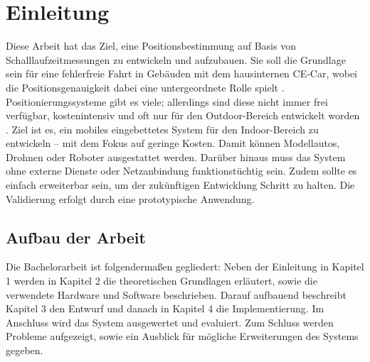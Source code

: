 \newpage
\section{Einleitung}

Diese Arbeit hat das Ziel, eine Positionsbestimmung auf Basis von Schalllaufzeitmessungen zu entwickeln und aufzubauen. Sie soll die Grundlage sein für eine fehlerfreie Fahrt in Gebäuden mit dem hausinternen CE-Car, wobei die Positionsgenauigkeit dabei eine untergeordnete Rolle spielt \cite{src_CE_CAR}. Positionierungssysteme gibt es viele; allerdings sind diese nicht immer frei verfügbar, kostenintensiv und oft nur für den Outdoor-Bereich entwickelt worden \cite{src_INDOOR_OUTDOOR}. Ziel ist es, ein mobiles eingebettetes System für den Indoor-Bereich zu entwickeln -- mit dem Fokus auf geringe Kosten. Damit können Modellautos, Drohnen oder Roboter ausgestattet werden. Darüber hinaus muss das System ohne externe Dienste oder Netzanbindung funktionstüchtig sein. Zudem sollte es einfach erweiterbar sein, um der zukünftigen Entwicklung Schritt zu halten. Die Validierung erfolgt durch eine prototypische Anwendung.

\subsection{Aufbau der Arbeit}
Die Bachelorarbeit ist folgendermaßen gegliedert: Neben der Einleitung in Kapitel 1 werden in Kapitel 2 die theoretischen Grundlagen erläutert, sowie die verwendete Hardware und Software beschrieben. Darauf aufbauend beschreibt Kapitel 3 den Entwurf und danach in Kapitel 4 die Implementierung. Im Anschluss wird das System ausgewertet und evaluiert. Zum Schluss werden Probleme aufgezeigt, sowie ein Ausblick für mögliche Erweiterungen des Systems gegeben.